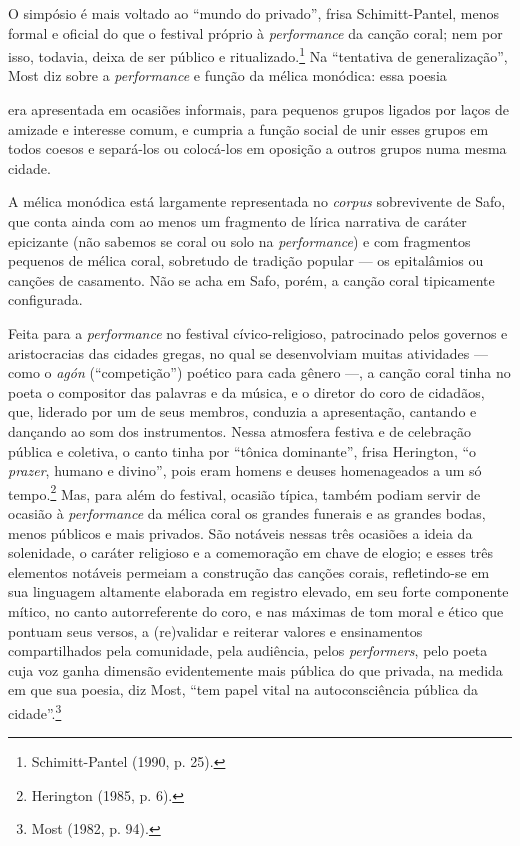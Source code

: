 O simpósio é mais voltado ao “mundo do privado”, frisa Schimitt-Pantel, menos
formal e oficial do que o festival próprio à \textit{performance}
da canção coral; nem por isso, todavia, deixa de ser público e
ritualizado.\footnote{ Schimitt-Pantel (1990, p. 25).} Na
“tentativa de generalização”, Most diz sobre a \textit{performance} e função da
mélica monódica: essa poesia 

\begin{hedraquote}
era apresentada em ocasiões informais, para
pequenos grupos ligados por laços de amizade e interesse comum, e cumpria a
função social de unir esses grupos em todos coesos e separá-los ou colocá-los
em oposição a outros grupos numa mesma cidade.
\end{hedraquote}

A mélica monódica está largamente representada no \textit{corpus} sobrevivente
de Safo, que conta ainda com ao menos um fragmento de lírica narrativa de
caráter epicizante (não sabemos se coral ou solo na \textit{performance}) e com
fragmentos pequenos de mélica coral, sobretudo de tradição popular --- os
epitalâmios ou canções de casamento. Não se acha em Safo, porém, a canção coral
tipicamente configurada.

Feita para a \textit{performance} no festival cívico-religioso, patrocinado
pelos governos e aristocracias das cidades gregas, no qual se
desenvolviam muitas atividades --- como o \textit{agón} (“competição”) poético
para cada gênero \mbox{---,} a canção coral tinha no poeta o compositor das palavras e
da música, e o diretor do coro de cidadãos, que, liderado por um de seus
membros, conduzia a apresentação, cantando e dançando ao som dos instrumentos.
Nessa atmosfera festiva e de celebração pública e coletiva, o canto tinha por
“tônica dominante”, frisa Herington, “o \textit{prazer}, humano e
divino”, pois eram homens e deuses homenageados a um só tempo.\footnote{ Herington (1985, p. 6).} Mas, para além
do festival, ocasião típica, também podiam servir de ocasião à
\textit{performance} da mélica coral os grandes funerais e as grandes bodas,
menos públicos e mais privados. São notáveis nessas três ocasiões a ideia da
solenidade, o caráter religioso e a comemoração em chave de elogio; e esses
três elementos notáveis permeiam a construção das canções corais, refletindo-se
em sua linguagem altamente elaborada em registro elevado, em seu forte
componente mítico, no canto autorreferente do coro, e nas máximas de tom moral
e ético que pontuam seus versos, a (re)validar e reiterar valores e
ensinamentos compartilhados pela comunidade, pela audiência, pelos
\textit{performers}, pelo poeta cuja voz ganha dimensão evidentemente mais
pública do que privada, na medida em que sua poesia, diz Most,
“tem papel vital na autoconsciência pública da cidade”.\footnote{ Most (1982, p. 94).}

